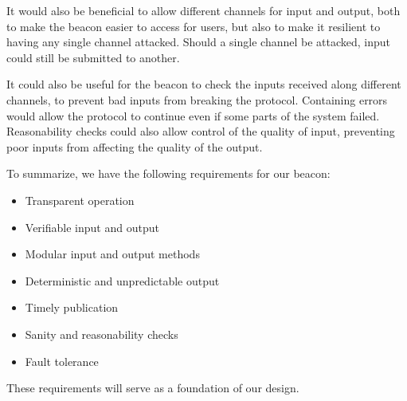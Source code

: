 It would also be beneficial to allow different channels for input and output, both to make the beacon easier to access for users, but also to make it resilient to having any single channel attacked.
Should a single channel be attacked, input could still be submitted to another.

It could also be useful for the beacon to check the inputs received along different channels, to prevent bad inputs from breaking the protocol.
Containing errors would allow the protocol to continue even if some parts of the system failed.
Reasonability checks could also allow control of the quality of input, preventing poor inputs from affecting the quality of the output.

To summarize, we have the following requirements for our beacon:

\begin{itemize}
    \setlength\itemsep{0em}
    \item Transparent operation
    \item Verifiable input and output
    \item Modular input and output methods
    \item Deterministic and unpredictable output
    \item Timely publication
    \item Sanity and reasonability checks
    \item Fault tolerance
\end{itemize}

These requirements will serve as a foundation of our design.


